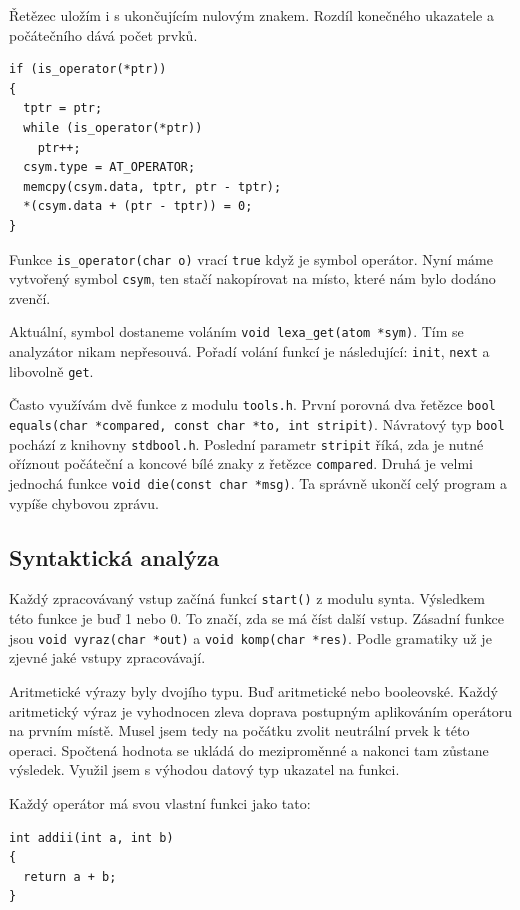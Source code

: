 \documentclass[a4paper, 12pt]{article}
\begin{document}
Řetězec uložím i s ukončujícím nulovým znakem.  Rozdíl konečného
ukazatele a počátečního dává počet prvků.

\begin{lstlisting}
if (is_operator(*ptr))
{
  tptr = ptr;
  while (is_operator(*ptr))
    ptr++;
  csym.type = AT_OPERATOR;
  memcpy(csym.data, tptr, ptr - tptr);
  *(csym.data + (ptr - tptr)) = 0;
}
\end{lstlisting}

Funkce \texttt{is\_operator(char o)} vrací \texttt{true} když
je symbol operátor. Nyní máme vytvořený symbol \texttt{csym}, ten
stačí nakopírovat na místo, které nám bylo dodáno zvenčí.

Aktuální, symbol dostaneme voláním
\verb+void lexa_get(atom *sym)+. Tím se analyzátor nikam nepřesouvá.
Pořadí volání funkcí je následující: \texttt{init}, \texttt{next} a
libovolně \texttt{get}.

Často využívám dvě funkce z modulu \texttt{tools.h}. První porovná
dva řetězce
\verb+bool equals(char *compared, const char *to, int stripit)+. Návratový
typ \texttt{bool} pochází z knihovny \texttt{stdbool.h}.  Poslední
parametr \texttt{stripit} říká, zda je nutné oříznout počáteční a
koncové bílé znaky z řetězce \texttt{compared}.  Druhá je velmi
jednochá funkce \verb+void die(const char *msg)+. Ta správně ukončí celý
program a vypíše chybovou zprávu.

\subsection{Syntaktická analýza}
Každý zpracovávaný vstup začíná funkcí \texttt{start()} z modulu
\textsf{synta}.  Výsledkem této funkce je buď 1 nebo 0. To značí, zda
se má číst další vstup.  Zásadní funkce jsou
\verb+void vyraz(char *out)+ a \verb+void komp(char *res)+. Podle
gramatiky už je zjevné jaké vstupy zpracovávají.

Aritmetické výrazy byly dvojího typu. Buď aritmetické nebo
booleovské. Každý aritmetický výraz je vyhodnocen zleva doprava
postupným aplikováním operátoru na prvním místě. Musel jsem tedy na
počátku zvolit neutrální prvek k této operaci. Spočtená hodnota se
ukládá do meziproměnné a nakonci tam zůstane výsledek.  Využil jsem s
výhodou datový typ ukazatel na funkci.

Každý operátor má svou vlastní funkci jako tato:
\begin{lstlisting}
int addii(int a, int b)
{
  return a + b;
}
\end{lstlisting}
\end{document}
